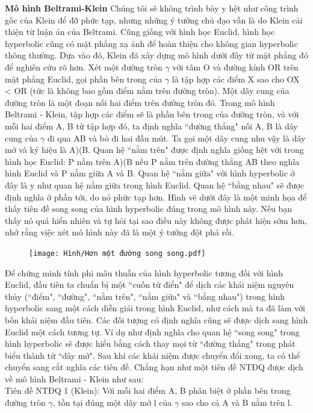 \begin{multicols}{2}
	\textbf{\color{lichsutoanhoc}Mô hình Beltrami-Klein}
	Chúng tôi sẽ không trình bày y hệt như công trình gốc của Klein để đỡ phức tạp, nhưng những ý tưởng chủ đạo vẫn là do Klein cải thiện từ luận án của Beltrami.
	Cũng giống với hình học Euclid, hình học hyperbolic cũng có mặt phẳng xạ ảnh để hoàn thiện cho không gian hyperbolic thông thường. Dựa vào đó, Klein đã xây dựng mô hình dưới đây từ mặt phẳng đó để nghiên cứu rõ hơn.
	Xét một đường tròn $\gamma$ với tâm O và đường kính OR trên mặt phẳng Euclid, gọi phần bên trong của $ \gamma$ là tập hợp các điểm X sao cho OX < OR (tức là không bao gồm điểm nằm trên đường tròn). Một dây cung của đường tròn là một đoạn nối hai điểm trên đường tròn đó.
	Trong mô hình Beltrami - Klein, tập hợp các điểm sẽ là phần bên trong của đường tròn, và với mỗi hai điểm A, B từ tập hợp đó, ta định nghĩa ``đường thẳng" nối A, B là dây cung của $ \gamma$ đi qua AB và bỏ đi hai đầu mút. Ta gọi một dây cung nhu vậy là dây mở và ký hiệu là A)(B. Quan hệ ``nằm trên" được định nghĩa giống hệt với trong hình học Euclid: P nằm trên A)(B nếu P nằm trên đường thẳng AB theo nghĩa hình Euclid và P nằm giữa A và B. Quan hệ ``nằm giữa" với hình hyperbolic ở đây là y như quan hệ nằm giữa trong hình Euclid. Quan hệ ``bằng nhau" sẽ được định nghĩa ở phần tới, do nó phức tạp hơn.
	Hình vẽ dưới đây là một minh họa để thấy tiên đề song song của hình hyperbolic đúng trong mô hình này. Nếu bạn thấy nó quá hiển nhiên và tự hỏi tại sao điều này không được phát hiện sớm hơn, nhớ rằng việc xét mô hình này đã là một ý tưởng đột phá rồi. 
	
	
	\begin{figure}[ht]
		\texttt{[image: Hình/Hơn một đường song song.pdf]}
	\end{figure}
	
	
	Để chứng minh tính phi mâu thuẫn của hình hyperbolic tương đối với hình Euclid, đầu tiên ta chuẩn bị một ``cuốn từ điển" để dịch các khái niệm nguyên thủy (``điểm", ``đường", ``nằm trên", ``nằm giữa" và ``bằng nhau") trong hình hyperbolic sang một cách diễn giải trong hình Euclid, như cách mà ta đã làm với bốn khái niệm đầu tiên. Các đối tượng có định nghĩa cũng sẽ được dịch sang hình Euclid một cách tương tự. Ví dụ như định nghĩa cho quan hệ ``song song" trong hình hyperbolic sẽ được hiểu bằng cách thay mọi từ ``đường thẳng" trong phát biểu thành từ ``dây mở". Sau khi các khái niệm được chuyển đổi xong, ta có thể chuyển sang cắt nghĩa các tiên đề. Chẳng hạn như một tiên đề NTĐQ được dịch về mô hình Beltrami - Klein như sau:\\
	Tiên đề NTĐQ 1 (Klein): Với mỗi hai điểm A, B phân biệt ở phần bên trong đường tròn $\gamma$, tồn tại đúng một dây mở l của $\gamma$ sao cho cả A và B nằm trên l. \\
	

\end{multicols}

